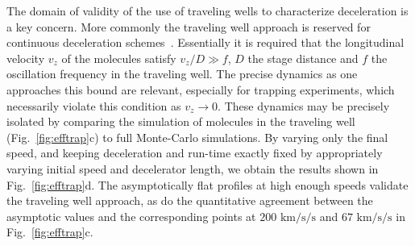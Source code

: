 \documentclass[%
 reprint,
 amsmath,amssymb,
 aps,
prl,
]{revtex4-1}
\begin{document}

The domain of validity of the use of traveling wells to characterize deceleration is a key concern.
More commonly the traveling well approach is reserved for continuous deceleration schemes~\cite{Osterwalder2010,Narevicius2008}.
Essentially it is required that the longitudinal velocity $v_z$ of the molecules satisfy $v_z/D \gg f$, $D$ the stage distance and $f$ the oscillation frequency in the traveling well.
The precise dynamics as one approaches this bound are relevant, especially for trapping experiments, which necessarily violate this condition as $v_z\rightarrow 0$.
These dynamics may be precisely isolated by comparing the simulation of molecules in the traveling well (Fig.~\ref{fig:efftrap}c) to full Monte-Carlo simulations.
By varying only the final speed, and keeping deceleration and run-time exactly fixed by appropriately varying initial speed and decelerator length, we obtain the results shown in Fig.~\ref{fig:efftrap}d.
The asymptotically flat profiles at high enough speeds validate the traveling well approach, as do the quantitative agreement between the asymptotic values and the corresponding points at $200\text{ km/s/s}$ and $67\text{ km/s/s}$ in Fig.~\ref{fig:efftrap}c.
\end{document}
